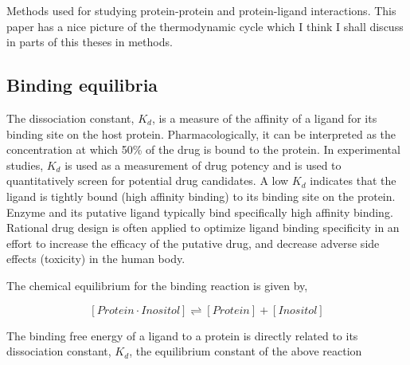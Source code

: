 
Methods used for studying protein-protein and protein-ligand interactions.\cite{Wang:2001ez}
This paper\cite{Durrant:2011bm} has a nice picture of the thermodynamic cycle which I think I shall discuss in parts of this theses in methods.

\subsection{Binding equilibria}


The dissociation constant, $K_d$, is a measure of the affinity of a ligand for its binding site on the host protein. Pharmacologically, it can be interpreted as the concentration at which 50\% of the drug is bound to the protein. In experimental studies, $K_d$ is used as a measurement of drug potency and is used to quantitatively screen for potential drug candidates.  A low $K_d$ indicates that the ligand is tightly bound (high affinity binding) to its binding site on the protein.  Enzyme and its putative ligand typically bind specifically high affinity binding.  Rational drug design is often applied to optimize ligand binding specificity in an effort to increase the efficacy of the putative drug, and decrease adverse side effects (toxicity) in the human body.

The chemical equilibrium for the binding reaction is given by,

    \begin{equation}
      \left[ Protein\cdot Inositol \right] 
      \rightleftharpoons 
      \left[ Protein \right]+\left[ Inositol \right]
    \end{equation}
  
    
The binding free energy of a ligand to a protein is directly related to its dissociation constant, $K_d$, the equilibrium constant of the above reaction

    
